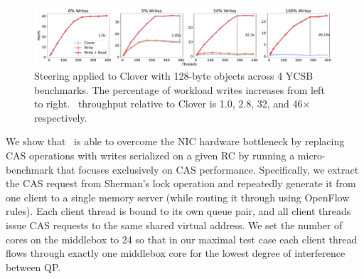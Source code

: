 \begin{figure}
    \includegraphics[width=1.0\textwidth]{fig/full_system_performance.pdf}
    \caption{Steering applied to Clover with 128-byte objects across 4 YCSB
    benchmarks. The percentage of workload writes increases from left to
    right. \sword\ throughput relative to Clover is 1.0, 2.8, 32, and 46$\times$ respectively.}
    \label{fig:full_system_performance}
\end{figure}

We show that \sword\ is able to overcome the NIC hardware
bottleneck by replacing CAS operations with writes
serialized on a given RC by running a micro-benchmark that
focuses exclusively on CAS performance. Specifically, we
extract the CAS request from Sherman's lock operation and
repeatedly generate it from one client to a single memory
server (while routing it through {\sword} using OpenFlow
rules).
Each client thread is bound to its own queue pair, and all
client threads issue CAS requests to the same shared virtual
address.  We set the number of cores on the {\sword}
middlebox to 24 so that in our maximal test case each client
thread flows through exactly one middlebox core for the
lowest degree of interference between QP.

